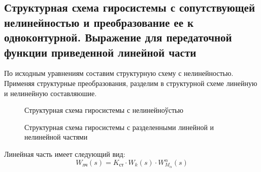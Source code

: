 \documentclass[main.tex]{subfiles}
\begin{document}
\subsection{Структурная схема гиросистемы с сопутствующей нелинейностью и
преобразование ее к одноконтурной. Выражение для передаточной функции
приведенной линейной части}
По исходным уравнениям составим структурную схему с нелинейностью. Применяя структурные
преобразования, разделим в структурной схеме линейную и нелинейную составляюшие. \par 
\begin{figure}[h]
    \caption{Структурная схема гиросистемы с нелинейноўстью}
\end{figure}
\begin{figure}[!h]
    \caption{Структурная схема гиросистемы с разделенными линейной и нелинейной частями}
\end{figure}
Линейная часть имеет следующий вид:
 \[ W_\text{лч}(s) = K_\text{ст}\cdot W_k(s)\cdot W^\alpha_{M_\alpha}(s) \]
\end{document}
